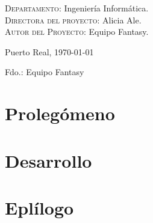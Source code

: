 \documentclass{book}
\begin{document}
{\begin{flushleft}
		\textsc{Departamento}: \nohyphens{Ingeniería Informática.} \\
		\textsc{Directora del proyecto}: \nohyphens{Alicia Ale.} \\
		\textsc{Autor del Proyecto}: \nohyphens{Equipo Fantasy}. \\
	\end{flushleft}
	
	\bigskip
	\bigskip
	\bigskip
	
	\begin{flushright}
		\large
		Puerto Real, \today
		
		\bigskip    
		\bigskip
		\bigskip
		\bigskip
		\bigskip
		\bigskip
		\bigskip
		\bigskip
		Fdo.: Equipo Fantasy
		
	\end{flushright}
	
}
	
	\newpage
	
	
	
	\tableofcontents
	\newpage
	
	\part{Prolegómeno}
	
	
	
	\part{Desarrollo}
	
	
	
	

	\part{Eplílogo}
	
	
	
	
\end{document}
